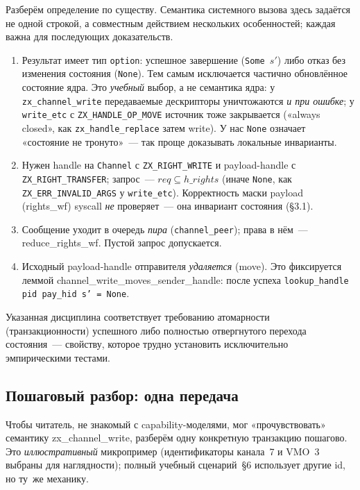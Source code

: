 \documentclass[11pt,a4paper]{article}
\newcommand{\isabel}[1]{{\isabelleit #1}}
\newcommand{\lemmaname}[1]{\isabel{#1}}
\begin{document}
Разберём определение по существу. Семантика системного вызова здесь
задаётся не одной строкой, а совместным действием нескольких
особенностей; каждая важна для последующих доказательств.
\begin{enumerate}[leftmargin=1.4em]
	\item Результат имеет тип \texttt{option}: успешное завершение
	      (\texttt{Some~$s'$}) либо отказ без изменения состояния
	      (\texttt{None}). Тем самым исключается частично обновлённое
	      состояние ядра. Это \emph{учебный} выбор, а не семантика ядра:
	      у \texttt{zx\_channel\_write} передаваемые дескрипторы
	      уничтожаются \emph{и при ошибке}; у \texttt{write\_etc} с
	      \texttt{ZX\_HANDLE\_OP\_MOVE} источник тоже закрывается
	      («always closed», как \texttt{zx\_handle\_replace} затем write).
	      У нас \texttt{None} означает «состояние не тронуто»~--- так проще
	      доказывать локальные инварианты.
	\item Нужен handle на \texttt{Channel} с \texttt{ZX\_RIGHT\_WRITE} и
	      payload-handle с \texttt{ZX\_RIGHT\_TRANSFER}; запрос~---
	      $\mathit{req}\subseteq h\_rights$ (иначе \texttt{None}, как
	      \texttt{ZX\_ERR\_INVALID\_ARGS} у \texttt{write\_etc}).
	      Корректность маски payload (\lemmaname{rights\_wf}) syscall
	      \emph{не} проверяет~--- она инвариант состояния (§3.1).
	\item Сообщение уходит в очередь \emph{пира} (\texttt{channel\_peer});
	      права в нём~--- \lemmaname{reduce\_rights\_wf}. Пустой запрос
	      допускается.
	\item Исходный payload-handle отправителя \emph{удаляется} (move). Это
	      фиксируется леммой
	      \lemmaname{channel\_write\_moves\_sender\_handle}: после успеха
	      \texttt{lookup\_handle pid pay\_hid s' = None}.
\end{enumerate}
Указанная дисциплина соответствует требованию атомарности (транзакционности)
успешного либо полностью отвергнутого перехода состояния~--- свойству,
которое трудно установить исключительно эмпирическими тестами.

\subsection{Пошаговый разбор: одна передача}

Чтобы читатель, не знакомый с \textenglish{capability}-моделями, мог
«прочувствовать» семантику \lemmaname{zx\_channel\_write}, разберём
одну конкретную транзакцию пошагово. Это \emph{иллюстративный}
микропример (идентификаторы канала~7 и VMO~3 выбраны для наглядности);
полный учебный сценарий~§6 использует другие id, но ту~же механику.
\end{document}
